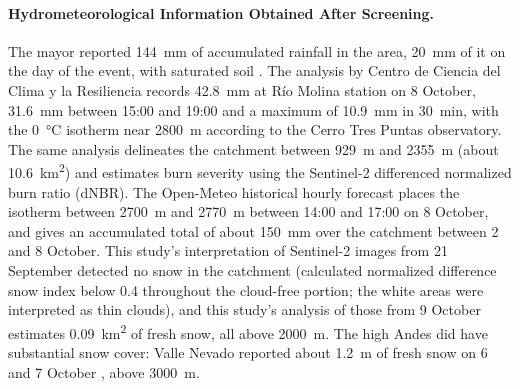\paragraph{Hydrometeorological Information Obtained After Screening.} The mayor reported \SI{144}{mm} of accumulated rainfall in the area, \SI{20}{mm} of it on the day of the event, with saturated soil \citep{interferencia2026}. The analysis by Centro de Ciencia del Clima y la Resiliencia \citep{cr2_2026} records \SI{42.8}{mm} at Río Molina station on 8 October, \SI{31.6}{mm} between 15:00 and 19:00 and a maximum of \SI{10.9}{mm} in \SI{30}{min}, with the \SI{0}{\celsius} isotherm near \SI{2800}{m} according to the Cerro Tres Puntas observatory. The same analysis delineates the catchment between \SI{929}{m} and \SI{2355}{m} (about \SI{10.6}{km^2}) and estimates burn severity using the Sentinel-2 differenced normalized burn ratio (dNBR). The Open-Meteo historical hourly forecast \citep{openmeteo2023} places the isotherm between \SI{2700}{m} and \SI{2770}{m} between 14:00 and 17:00 on 8 October, and gives an accumulated total of about \SI{150}{mm} over the catchment between 2 and 8 October. This study’s interpretation of Sentinel-2 images \citep{drusch2012} from 21 September detected no snow in the catchment (calculated normalized difference snow index below 0.4 throughout the cloud-free portion; the white areas were interpreted as thin clouds), and this study’s analysis of those from 9 October estimates \SI{0.09}{km^2} of fresh snow, all above \SI{2000}{m}. The high Andes did have substantial snow cover: Valle Nevado reported about \SI{1.2}{m} of fresh snow on 6 and 7 October \citep{emol2026valle}, above \SI{3000}{m}.


